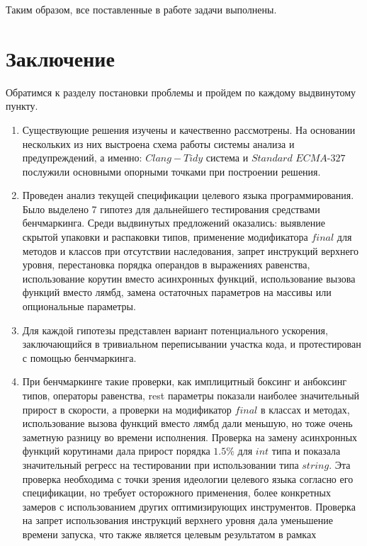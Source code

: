 \documentclass{mipt-thesis-bs}
\begin{document}
Таким образом, все поставленные в работе задачи выполнены.

\chapter{Заключение}

Обратимся к разделу постановки проблемы и пройдем по каждому выдвинутому пункту.

\begin{enumerate}
    \item Существующие решения изучены и качественно рассмотрены. 
    На основании нескольких из них выстроена схема 
    работы системы анализа и предупреждений, а именно: $Clang-Tidy$ система и $Standard$ $ECMA$-$327$ послужили основными опорными 
    точками при построении решения.
    \item Проведен анализ текущей спецификации целевого языка программирования. Было выделено 7 гипотез для дальнейшего тестирования 
    средствами бенчмаркинга. Среди выдвинутых предложений оказались: выявление скрытой упаковки 
    и распаковки типов, применение модификатора $final$ для методов и классов при отсутствии наследования, 
    запрет инструкций верхнего уровня, перестановка порядка операндов в выражениях равенства, 
    использование корутин вместо асинхронных функций, использование вызова функций вместо лямбд,
    замена остаточных параметров на массивы или опциональные параметры.
    \item Для каждой гипотезы представлен вариант потенциального ускорения, заключающийся в тривиальном 
    переписывании участка кода, и протестирован с помощью бенчмаркинга.
    \item При бенчмаркинге такие проверки, как имплицитный боксинг и анбоксинг типов, операторы равенства, rest 
    параметры показали наиболее значительный прирост в скорости, а проверки на модификатор $final$ в классах 
    и методах, использование вызова функций вместо лямбд дали меньшую, но тоже очень заметную разницу
    во времени исполнения. Проверка на замену асинхронных функций корутинами дала прирост порядка $1.5\%$ для 
    $int$ типа и показала значительный регресс на тестировании при использовании типа $string$. Эта проверка 
    необходима с точки зрения идеологии целевого языка согласно его спецификации, но требует осторожного применения, 
    более конкретных замеров с использованием других оптимизирующих инструментов. Проверка на запрет использования 
    инструкций верхнего уровня дала уменьшение времени запуска, что также является целевым результатом в рамках 

\end{enumerate}
\end{document}

